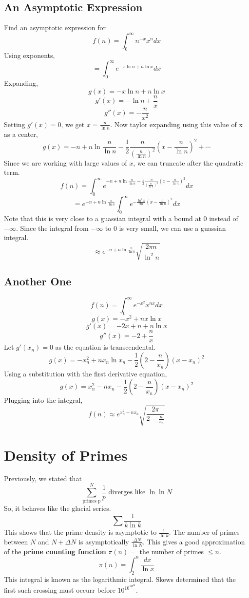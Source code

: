 \documentclass[../main.tex]{subfiles}
\begin{document}
\subsection{An Asymptotic Expression}
Find an asymptotic expression for
$$f(n)=\int_{0}^{\infty}n^{-x}x^{n}dx$$
Using exponents,
$$=\int_{0}^{\infty}e^{-x\ln n + n\ln x}dx$$
Expanding,
$$g(x)=-x\ln n + n\ln x$$
$$g'(x)=-\ln n + \frac{n}{x}$$
$$g''(x)=-\frac{n}{x^{2}}$$
Setting $g'(x)=0$, we get $x=\frac{n}{\ln n}$.
Now taylor expanding using this value of x as a center,
$$g(x)=-n+n\ln\frac{n}{\ln n}-\frac{1}{2}\frac{n}{(\frac{n}{\ln n})^{2}}(x-\frac{n}{\ln n})^{2}+\cdots$$ 
Since we are working with large values of $x$, we can truncate after the quadratic term.
$$f(n)=\int_{0}^{\infty}e^{-n+n\ln\frac{n}{\ln n}-\frac{1}{2}\frac{n}{(\frac{n}{\ln n})^{2}}(x-\frac{n}{\ln n})^{2}}dx$$
$$=e^{-n+n\ln\frac{n}{\ln n}}\int_{0}^{\infty}e^{-\frac{\ln^{2}n}{2n}(x-\frac{n}{\ln n})^{2}}dx$$
Note that this is very close to a guassian integral with a bound at $0$ instead of $-\infty$. Since the integral
from $-\infty$ to $0$ is very small, we can use a guassian integral.
$$\approx e^{-n+n\ln\frac{n}{\ln n}}\sqrt{\frac{2\pi n}{\ln^{2}n}}$$

\subsection{Another One}
$$f(n)=\int_{0}^{\infty}e^{-x^{2}}x^{nx}dx$$
$$g(x)=-x^{2}+nx\ln x$$
$$g'(x)=-2x+n+n\ln x$$
$$g''(x)=-2+\frac{n}{x}$$
Let $g'(x_{n})=0$ as the equation is transcendental.
$$g(x)=-x_{n}^{2}+nx_{n}\ln x_{n}-\frac{1}{2}(2-\frac{n}{x_{n}})(x-x_{n})^{2}$$
Using a substitution with the first derivative equation,
$$g(x)=x_{n}^{2} -nx_{n}-\frac{1}{2}(2-\frac{n}{x_{n}})(x-x_{n})^{2}$$
Plugging into the integral,
$$f(n)\approx e^{x_{n}^{2}-nx_{n}}\sqrt{\frac{2\pi}{2-\frac{n}{x_{n}}}}$$

\section{Density of Primes}
Previously, we stated that $$\sum_{\text{primes p}}^{N}\frac{1}{p}\text{ diverges like }\ln\ln N$$
So, it behaves like the glacial series.
$$\sum\frac{1}{k\ln k}$$
This shows that the prime density is asymptotic to $\frac{1}{\ln k}$.
The number of primes between $N$ and $N+\Delta N$ is asymptotically $\frac{\Delta N}{\ln N}$.
This gives a good approximation of the \textbf{prime counting function} $\pi (n)=$ the number of primes $\leq n$.
$$\pi(n)=\int_{2}^{n}\frac{dx}{\ln x}$$
This integral is known as the logarithmic integral. Skews determined that the first such crossing must occurr before
$10^{10^{10^{34}}}$.
\end{document}
